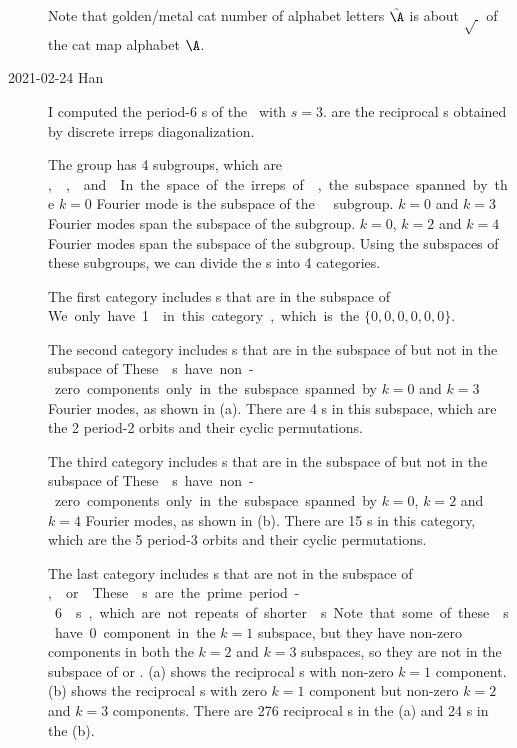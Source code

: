 \begin{description}
Note that golden/metal cat number of alphabet letters $\tilde{\A}$
is about $\sqrt{~}$ of the cat map alphabet ${\A}$.

    \item[2021-02-24 Han]
I computed the period-6 {\lattstate}s of the \templatt\ with $s=3$.
 are the reciprocal
{\lattstate}s obtained by discrete  irreps diagonalization.

The  group has 4 subgroups,
which are \unit, ,  and . In the space of the irreps of , the subspace
spanned by the $k=0$ Fourier mode is the subspace of the \unit\ subgroup.
$k=0$ and $k=3$ Fourier modes span the subspace of the  subgroup.
$k=0$, $k=2$ and $k=4$ Fourier modes span the subspace of the  subgroup.
Using the subspaces of these subgroups, we can divide the {\lattstate}s into 4 categories.

The first category includes {\lattstate}s that are in the subspace of \unit.
We only have 1 {\lattstate} in this category, which is the $\{0,0,0,0,0,0\}$.

The second category includes {\lattstate}s that are in the subspace of  but not in the
subspace of \unit. These {\lattstate}s have non-zero components only in the subspace spanned
by $k=0$ and $k=3$ Fourier modes, as shown in  (a). There are
4 {\lattstate}s in this subspace, which are the 2 period-2 orbits and their cyclic permutations.

The third category includes {\lattstate}s that are in the subspace of  but not
in the subspace of \unit. These {\lattstate}s have non-zero components
only in the subspace spanned by $k=0$, $k=2$ and $k=4$
Fourier modes, as shown in  (b).
There are 15 {\lattstate}s in this category, which are the 5 period-3 orbits and their
cyclic permutations.

The last category includes {\lattstate}s that are not in the subspace of \unit,  or .
These {\lattstate}s are the prime period-6 {\lattstate}s, which are not repeats of shorter {\lattstate}s.
Note that some of these {\lattstate}s have 0 component in the $k=1$ subspace, but they have
non-zero components in both the $k=2$ and $k=3$ subspaces, so they are not in the subspace of
 or .
 (a) shows the reciprocal {\lattstate}s with non-zero $k=1$
component.  (b) shows the reciprocal {\lattstate}s with zero
$k=1$ component but non-zero $k=2$ and $k=3$ components. There are 276 reciprocal {\lattstate}s in the  (a) and 24 {\lattstate}s in the
 (b).


\end{description}
